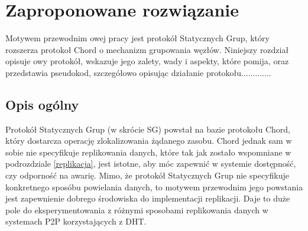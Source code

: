 \documentclass[12pt, twoside, openany]{report}
\begin{document}
\chapter{Zaproponowane rozwiązanie}
\label{rozdzial_rozwiazanie}


Motywem przewodnim owej pracy jest protokół Statycznych Grup, który rozszerza protokoł Chord o mechanizm grupowania węzłów. Niniejszy rozdział opisuje owy protokół, wskazuje jego zalety, wady i aspekty, które pomija, oraz przedstawia pseudokod, szczegółowo opisując działanie protokołu.............

\section{Opis ogólny}
Protokół Statycznych Grup (w skrócie SG) powstał na bazie protokołu Chord, który dostarcza operację zlokalizowania żądanego zasobu. Chord jednak sam w sobie nie specyfikuje replikowania danych, które tak jak zostało wspomniane w podrozdziale \ref{replikacja}, jest istotne, aby móc zapewnić w systemie dostępność, czy odporność na awarię. Mimo, że protokół Statycznych Grup nie specyfikuje konkretnego sposóbu powielania danych, to motywem przewodnim jego powstania jest zapewnienie dobrego środowiska do implementacji replikacji. Daje to duże pole do eksperymentowania z różnymi sposobami replikowania danych w systemach P2P korzystających z DHT.
\end{document}
